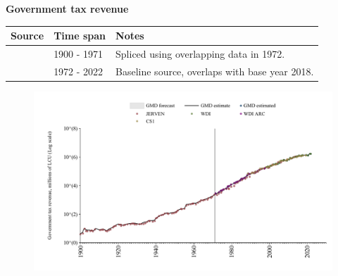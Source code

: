 \documentclass[12pt,a4paper,landscape]{article}
\begin{document}
\begin{adjustbox}{max totalsize={\paperwidth}{\paperheight},center}
\begin{minipage}[t][\textheight][t]{\textwidth}
\vspace*{0.5cm}
{}
\begin{center}
{\Large\bfseries Government tax revenue}
\end{center}
\vspace{0.5cm}
\begin{table}[H]
\centering
\small
\begin{tabular}{|l|l|l|}
\hline
\textbf{Source} & \textbf{Time span} & \textbf{Notes} \\
\hline
\rowcolor{white}\cite{JERVEN}& 1900 - 1971 &Spliced using overlapping data in 1972. \\
\rowcolor{lightgray}\cite{GMD_estimated}& 1972 - 2022 &Baseline source, overlaps with base year 2018. \\
\hline
\end{tabular}
\end{table}
\begin{figure}[H]
\centering
\includegraphics[width=\textwidth,height=0.6\textheight,keepaspectratio]{graphs/ZAF_govtax.pdf}
\end{figure}
\end{minipage}
\end{adjustbox}
\end{document}

